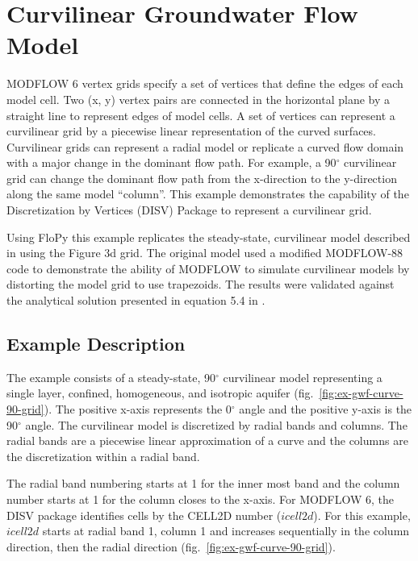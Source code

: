 \section{Curvilinear Groundwater Flow Model}
MODFLOW 6 vertex grids specify a set of vertices that define the edges of each model cell. Two (x, y) vertex pairs are connected in the horizontal plane by a straight line to represent edges of model cells. A set of vertices can represent a curvilinear grid \citep{romero2006grid} by a piecewise linear representation of the curved surfaces. Curvilinear grids can represent a radial model or replicate a curved flow domain with a major change in the dominant flow path. For example, a 90$^{\circ}$ curvilinear grid can change the dominant flow path from the x-direction to the y-direction along the same model ``column''.  This example demonstrates the capability of the Discretization by Vertices (DISV) Package to represent a curvilinear grid.

Using FloPy this example replicates the steady-state, curvilinear model described in \cite{romero2006grid} using the Figure 3d grid. The original model used a modified MODFLOW-88 \citep{modflow88} code to demonstrate the ability of MODFLOW to simulate curvilinear models by distorting the model grid to use trapezoids. The results were validated against the analytical solution presented in equation 5.4 in \cite{crank1975diffusion}.


\subsection{Example Description}

The example consists of a steady-state, 90$^{\circ}$ curvilinear model representing a single layer, confined, homogeneous, and isotropic aquifer (fig.~\ref{fig:ex-gwf-curve-90-grid}). The positive x-axis represents the 0$^{\circ}$ angle and the positive y-axis is the 90$^{\circ}$ angle. The curvilinear model is discretized by radial bands and columns. The radial bands are a piecewise linear approximation of a curve and the columns are the discretization within a radial band.

The radial band numbering starts at 1 for the inner most band and the column number starts at 1 for the column closes to the x-axis. For MODFLOW 6, the DISV package identifies cells by the CELL2D number ($icell2d$). For this example, $icell2d$ starts at radial band 1, column 1 and increases sequentially in the column direction, then the radial direction (fig.~\ref{fig:ex-gwf-curve-90-grid}).

